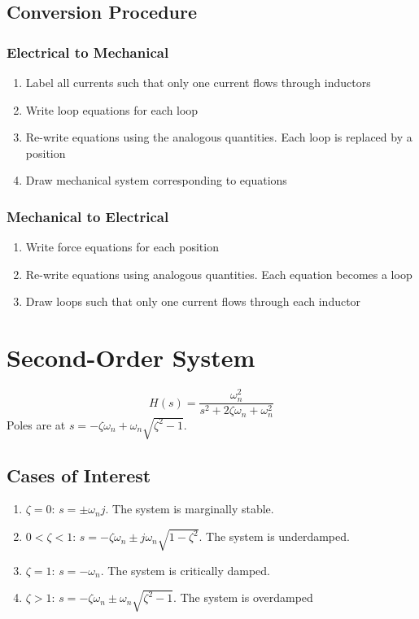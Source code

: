 \subsection*{Conversion Procedure}
\subsubsection*{Electrical to Mechanical}
\begin{enumerate}
  \item Label all currents such that only one current flows through inductors
  \item Write loop equations for each loop
  \item Re-write equations using the analogous quantities. Each loop is replaced by a position
  \item Draw mechanical system corresponding to equations
\end{enumerate} 
\subsubsection*{Mechanical to Electrical}
\begin{enumerate}
  \item Write force equations for each position
  \item Re-write equations using analogous quantities. Each equation becomes a loop
  \item Draw loops such that only one current flows through each inductor
\end{enumerate}

\clearpage
\section*{Second-Order System}
\begin{center}
  \[
	H(s) = \frac{\omega_n^2}{s^2+2\zeta\omega_n+\omega_n^2}
  \]
Poles are at $s = -\zeta\omega_n + \omega_n\sqrt{\zeta^2-1}$.
\end{center}
\subsection*{Cases of Interest}
\begin{enumerate}
  \item[] \textbf{$\zeta = 0$}: $s=\pm \omega_nj$. The system is marginally stable.
  \item[] \textbf{$0 < \zeta < 1$}: $s = -\zeta\omega_n\pm j\omega_n\sqrt{1-\zeta^2}$. The system is underdamped.
  \item[] \textbf{$\zeta = 1$}: $s = -\omega_n$. The system is critically damped.
  \item[] \textbf{$\zeta > 1$}: $s = -\zeta\omega_n \pm \omega_n\sqrt{\zeta^2-1}$. The system is overdamped
\end{enumerate}
